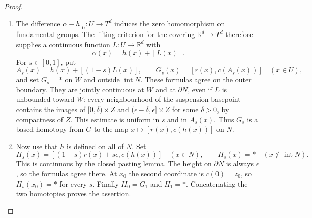 \begin{proof}
\begin{enumerate}[label=\arabic*.,leftmargin=*]
\item The difference $\alpha-h|_U:U\to T^d$ induces the zero homomorphism
on fundamental groups. The lifting criterion for the covering
$\mathbb R^d\to T^d$ therefore supplies a continuous function
$L:U\to\mathbb R^d$ with
\[
 \alpha(x)=h(x)+[L(x)].
\]
For $s\in[0,1]$, put
\[
 A_s(x)=h(x)+[(1-s)L(x)],\qquad
 G_s(x)=[r(x),c(A_s(x))]\quad(x\in U),
\]
and set $G_s=*$ on $W$ and outside $\operatorname{int}N$.
These formulas agree on the outer boundary. They are jointly continuous
at $W$ and at $\partial N$, even if $L$ is unbounded toward $W$:
every neighbourhood of the suspension basepoint contains the images of
$[0,\delta)\times Z$ and $(\epsilon-\delta,\epsilon]\times Z$
for some $\delta>0$, by compactness of $Z$. This estimate is uniform
in $s$ and in $A_s(x)$. Thus $G_s$ is a based homotopy from $G$
to the map $x\mapsto[r(x),c(h(x))]$ on $N$.

\item Now use that $h$ is defined on all of $N$. Set
\[
 H_s(x)=[(1-s)r(x)+s\epsilon,c(h(x))]
 \quad(x\in N),
 \qquad H_s(x)=*\quad(x\notin\operatorname{int}N).
\]
This is continuous by the closed pasting lemma. The height on
$\partial N$ is always $\epsilon$, so the formulas agree there.
At $x_0$ the second coordinate is $c(0)=z_0$, so $H_s(x_0)=*$
for every $s$. Finally $H_0=G_1$ and $H_1=*$.
Concatenating the two homotopies proves the assertion.
\end{enumerate}
\end{proof}

